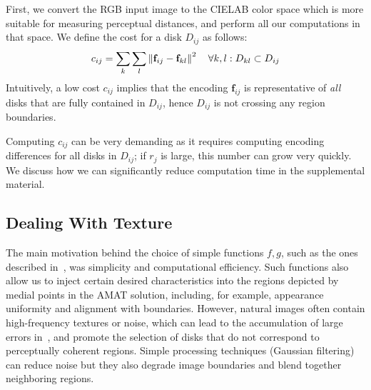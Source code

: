 \documentclass[10pt,twocolumn,letterpaper]{article}
\begin{document}
First, we convert the RGB input image to the CIELAB color space which is more suitable for measuring perceptual distances,
and perform all our computations in that space.
We define the cost for a disk $D_{ij}$ as follows:
\begin{equation}
c_{ij} = \sum_k \sum_l \left \lVert \mathbf{f}_{ij} - \mathbf{f}_{kl}  \right \rVert^2 \quad \forall k,l: D_{kl} \subset D_{ij}
\label{eq:diskcost}
\end{equation}
Intuitively, a low cost $c_{ij}$ implies that the encoding $\mathbf{f}_{ij}$ is representative of \emph{all}
disks that are fully contained in $D_{ij}$, hence $D_{ij}$ is not crossing any region boundaries.

Computing $c_{ij}$ can be very demanding as it requires computing encoding differences for all 
disks in $D_{ij}$; if $r_j$ is large, this number can grow very quickly.
We discuss how we can significantly reduce computation time in the supplemental material.


\subsection{Dealing With Texture}\label{sec:implementation:texture}
The main motivation behind the choice of simple functions $f,g$,
such as the ones described in~, was simplicity and  computational efficiency.
Such functions also allow us to inject certain desired characteristics into the regions depicted by medial points in the AMAT solution, 
including, for example, appearance uniformity and alignment with boundaries.
However, natural images often contain high-frequency textures or noise, which can lead to the accumulation of large errors 
in~, and promote the selection of disks that do not correspond to perceptually coherent regions. 
Simple processing techniques (\eg Gaussian filtering) can reduce noise but they also degrade image boundaries and
blend together neighboring regions.
\end{document}
